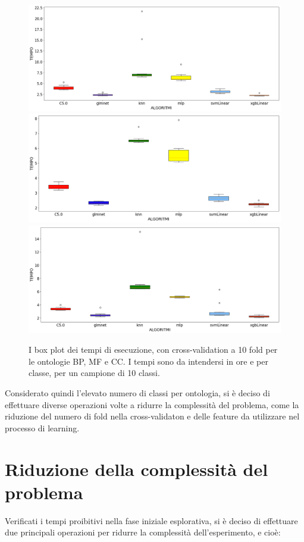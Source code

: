 \documentclass[12pt]{report}
\begin{document}
\begin{figure}[hp!]
\center
\includegraphics[scale=0.23]{images/BP_box_plot_times.png}
\includegraphics[scale=0.23]{images/MF_box_plot_times.png}
\includegraphics[scale=0.23]{images/CC_box_plot_times.png}
\caption{\footnotesize{I box plot dei tempi di esecuzione, con cross-validation a 10 fold per le ontologie BP, MF e CC. I tempi sono da intendersi in ore e per classe, per un campione di 10 classi.}}
\label{boxplot_p}
\end{figure}
Considerato quindi l'elevato numero di classi per ontologia, si è deciso di effettuare diverse operazioni volte a ridurre la complessità del problema, come la riduzione del numero di fold nella cross-validaton e delle feature da utilizzare nel processo di learning. 

\section{Riduzione della complessità del problema}
Verificati i tempi proibitivi nella fase iniziale esplorativa, si è deciso di effettuare due principali operazioni per ridurre la complessità dell'esperimento, e cioè:
\end{document}
